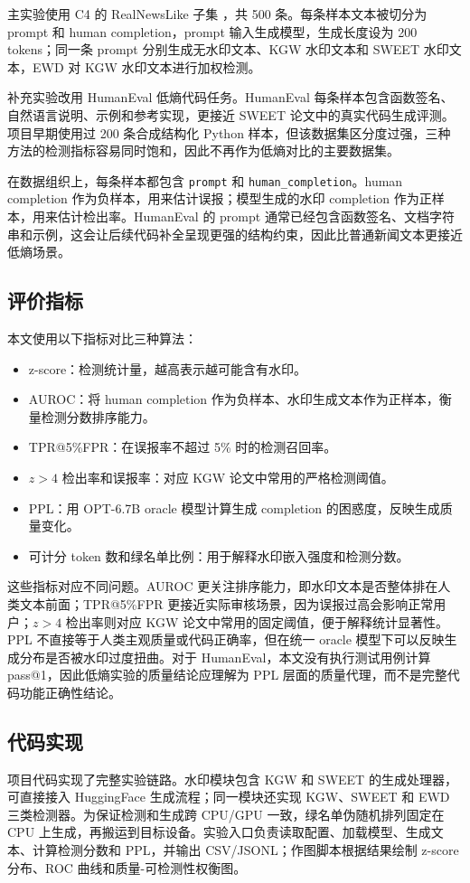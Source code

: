 \documentclass{SYSUReport}
\begin{document}
主实验使用 C4 的 RealNewsLike 子集 \cite{raffel2020c4}，共 500 条。每条样本文本被切分为 prompt 和 human completion，prompt 输入生成模型，生成长度设为 200 tokens；同一条 prompt 分别生成无水印文本、KGW 水印文本和 SWEET 水印文本，EWD 对 KGW 水印文本进行加权检测。

补充实验改用 HumanEval 低熵代码任务。HumanEval 每条样本包含函数签名、自然语言说明、示例和参考实现，更接近 SWEET 论文中的真实代码生成评测。项目早期使用过 200 条合成结构化 Python 样本，但该数据集区分度过强，三种方法的检测指标容易同时饱和，因此不再作为低熵对比的主要数据集。

在数据组织上，每条样本都包含 \texttt{prompt} 和 \texttt{human\_completion}。human completion 作为负样本，用来估计误报；模型生成的水印 completion 作为正样本，用来估计检出率。HumanEval 的 prompt 通常已经包含函数签名、文档字符串和示例，这会让后续代码补全呈现更强的结构约束，因此比普通新闻文本更接近低熵场景。

\subsection{评价指标}
本文使用以下指标对比三种算法：
\begin{itemize}
    \item z-score：检测统计量，越高表示越可能含有水印。
    \item AUROC：将 human completion 作为负样本、水印生成文本作为正样本，衡量检测分数排序能力。
    \item TPR@5\%FPR：在误报率不超过 5\% 时的检测召回率。
    \item $z>4$ 检出率和误报率：对应 KGW 论文中常用的严格检测阈值。
    \item PPL：用 OPT-6.7B oracle 模型计算生成 completion 的困惑度，反映生成质量变化。
    \item 可计分 token 数和绿名单比例：用于解释水印嵌入强度和检测分数。
\end{itemize}

这些指标对应不同问题。AUROC 更关注排序能力，即水印文本是否整体排在人类文本前面；TPR@5\%FPR 更接近实际审核场景，因为误报过高会影响正常用户；$z>4$ 检出率则对应 KGW 论文中常用的固定阈值，便于解释统计显著性。PPL 不直接等于人类主观质量或代码正确率，但在统一 oracle 模型下可以反映生成分布是否被水印过度扭曲。对于 HumanEval，本文没有执行测试用例计算 pass@1，因此低熵实验的质量结论应理解为 PPL 层面的质量代理，而不是完整代码功能正确性结论。

\subsection{代码实现}
项目代码实现了完整实验链路。水印模块包含 KGW 和 SWEET 的生成处理器，可直接接入 HuggingFace 生成流程；同一模块还实现 KGW、SWEET 和 EWD 三类检测器。为保证检测和生成跨 CPU/GPU 一致，绿名单伪随机排列固定在 CPU 上生成，再搬运到目标设备。实验入口负责读取配置、加载模型、生成文本、计算检测分数和 PPL，并输出 CSV/JSONL；作图脚本根据结果绘制 z-score 分布、ROC 曲线和质量-可检测性权衡图。
\end{document}
